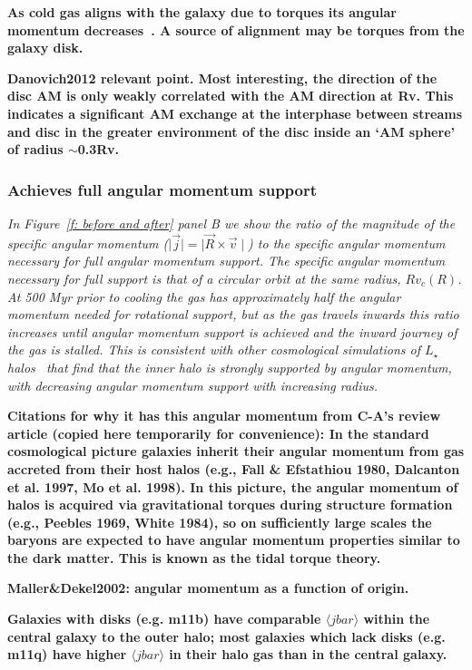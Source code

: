 \documentclass[fleqn,usenatbib]{mnras}
\begin{document}
\textbf{
As cold gas aligns with the galaxy due to torques its angular momentum decreases~\citep{Danovich2015}.
A source of alignment may be torques from the galaxy disk.
}

\textbf{
Danovich2012 relevant point.
Most interesting, the direction of the disc AM is only weakly correlated with the AM direction at Rv. This indicates a significant AM exchange at the interphase between streams and disc in the greater environment of the disc inside an ‘AM sphere’ of radius $\sim$0.3Rv.
}

\subsubsection{Achieves full angular momentum support}

\textit{
In Figure~\ref{f: before and after} panel B we show the ratio of the magnitude of the specific angular momentum ($\mid \vec j \mid = \mid \vec R \times \vec v \mid$) to the specific angular momentum necessary for full angular momentum support.
The specific angular momentum necessary for full support is that of a circular orbit at the same radius, $R v_c(R)$.
At 500 Myr prior to cooling the gas has approximately half the angular momentum needed for rotational support, but as the gas travels inwards this ratio increases until angular momentum support is achieved and the inward journey of the gas is stalled.
This is consistent with other cosmological simulations of $L_\star$ halos~\citep[e.g.][]{Oppenheimer2018} that find that the inner halo is strongly supported by angular momentum, with decreasing angular momentum support with increasing radius.
}

\textbf{Citations for why it has this angular momentum from C-A's review article (copied here temporarily for convenience):
In the standard cosmological picture galaxies inherit their angular momentum from gas accreted from their host halos (e.g., Fall \& Efstathiou 1980, Dalcanton et al. 1997, Mo et al. 1998). In this picture, the angular momentum of halos is acquired via gravitational torques during structure formation (e.g., Peebles 1969, White 1984), so on sufficiently large scales the baryons are expected to have angular momentum properties similar to the dark matter. This is known as the tidal torque theory.}

\textbf{Maller\&Dekel2002: angular momentum as a function of origin.}

\textbf{
\cite{El-Badry2018a}
Galaxies with disks (e.g. m11b) have comparable $\langle jbar \rangle$  within the central galaxy to the outer halo; most galaxies which lack disks (e.g. m11q) have higher $\langle jbar \rangle$ in their halo gas than in the central galaxy.
}
\end{document}
